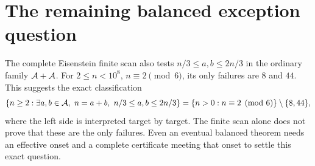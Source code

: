 \section{The remaining balanced exception question}\label{sec:balanced}
The complete Eisenstein finite scan also tests
$n/3\le a,b\le2n/3$ in the ordinary family $\AA+\AA$.
For $2\le n<10^8$, $n\equiv2\pmod6$, its only failures are $8$ and $44$.
This suggests the exact classification
\[
 \{n\ge2:\exists a,b\in\AA,\ n=a+b,\ n/3\le a,b\le2n/3\}
       =\{n>0:n\equiv2\pmod6\}\setminus\{8,44\},
\]
where the left side is interpreted target by target.
The finite scan alone does not prove that these are the only failures.
Even an eventual balanced theorem needs an effective onset and a
complete certificate meeting that onset to settle this exact question.
